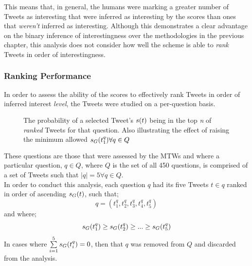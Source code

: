 This means that, in general, the humans were marking a greater number of Tweets as interesting that were inferred as interesting by the scores than ones that \textit{weren't} inferred as interesting. Although this demonstrates a clear advantage on the binary inference of interestingness over the methodologies in the previous chapter, this analysis does not consider how well the scheme is able to \textit{rank} Tweets in order of interestingness.


\subsubsection{Ranking Performance}

In order to assess the ability of the scores to effectively rank Tweets in order of inferred interest \textit{level}, the Tweets were studied on a per-question basis.

\begin{figure}[h]
\centering
{}
\caption{The probability of a selected Tweet's $s(t)$ being in the top \textit{n} of \textit{ranked} Tweets for that question. Also illustrating the effect of raising the minimum allowed $s_G(t^q_1) \forall q \in Q$}
\label{fig:score-dist}
\end{figure}

These questions are those that were assessed by the MTWs and where a particular question, $q \in Q$, where $Q$ is the set of all 450 questions, is comprised of a set of Tweets such that $|q| = 5 \forall q \in Q$.\\
In order to conduct this analysis, each question $q$ had its five Tweets $t \in q$ ranked in order of ascending $s_G(t)$, such that;
\[
    q = (t^q_1, t^q_2, t^q_3, t^q_4, t^q_5)
\]
and where; 
\[
    s_G(t^q_1) \geq s_G(t^q_2) \geq ... \geq s_G(t^q_5)
\]
In cases where $\sum\limits_{i=1}^5 s_G(t^q_i) = 0$, then that $q$ was removed from $Q$ and discarded from the analysis.

